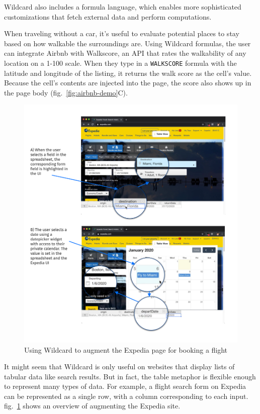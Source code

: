 \documentclass[english,submission]{programming}
\begin{document}
Wildcard also includes a formula language, which enables more
sophisticated customizations that fetch external data and perform
computations.

When traveling without a car, it's useful to evaluate potential places
to stay based on how walkable the surroundings are. Using Wildcard
formulas, the user can integrate Airbnb with Walkscore, an API that
rates the walkability of any location on a 1-100 scale. When they type
in a \texttt{WALKSCORE} formula with the latitude and longitude of the
listing, it returns the walk score as the cell's value. Because the
cell's contents are injected into the page, the score also shows up in
the page body{ (fig.~\ref{fig:airbnb-demo}C)}.

\begin{figure}
\hypertarget{fig:expedia-demo}{%
\centering
\includegraphics{media/expedia-demo-300dpi.png}
\caption{Using Wildcard to augment the Expedia page for booking a
flight}\label{fig:expedia-demo}
}
\end{figure}

It might seem that Wildcard is only useful on websites that display
lists of tabular data like search results. But in fact, the table
metaphor is flexible enough to represent many types of data. For
example, a flight search form on Expedia can be represented as a single
row, with a column corresponding to each input. {
fig.~\ref{fig:expedia-demo} shows an overview of augmenting the Expedia
site.}
\end{document}
